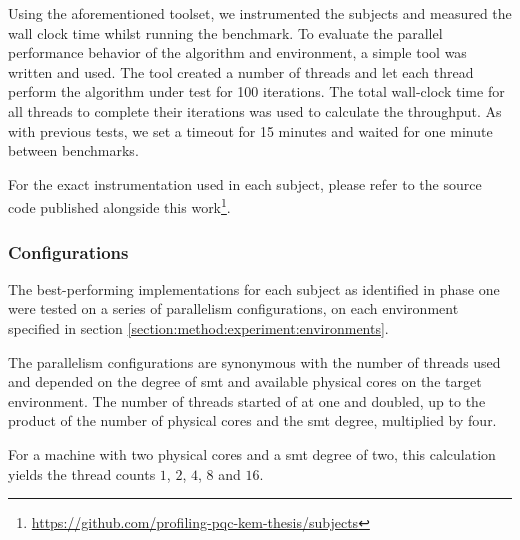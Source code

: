 Using the aforementioned toolset, we instrumented the subjects and measured the wall clock time whilst running the benchmark. To evaluate the parallel performance behavior of the algorithm and environment, a simple tool was written and used. The tool created a number of threads and let each thread perform the algorithm under test for 100 iterations. The total wall-clock time for all threads to complete their iterations was used to calculate the throughput. As with previous tests, we set a timeout for 15 minutes and waited for one minute between benchmarks.

For the exact instrumentation used in each subject, please refer to the source code published alongside this work\footnote{\href{https://github.com/profiling-pqc-kem-thesis/subjects}{https://github.com/profiling-pqc-kem-thesis/subjects}}.

\subsubsection{Configurations}
\label{section:method:experiment:phase2:configurations}

The best-performing implementations for each subject as identified in phase one were tested on a series of parallelism configurations, on each environment specified in section \ref{section:method:experiment:environments}.

The parallelism configurations are synonymous with the number of threads used and depended on the degree of \gls{smt} and available physical cores on the target environment. The number of threads started of at one and doubled, up to the product of the number of physical cores and the \gls{smt} degree, multiplied by four.

For a machine with two physical cores and a \gls{smt} degree of two, this calculation yields the thread counts $1$, $2$, $4$, $8$ and $16$.
